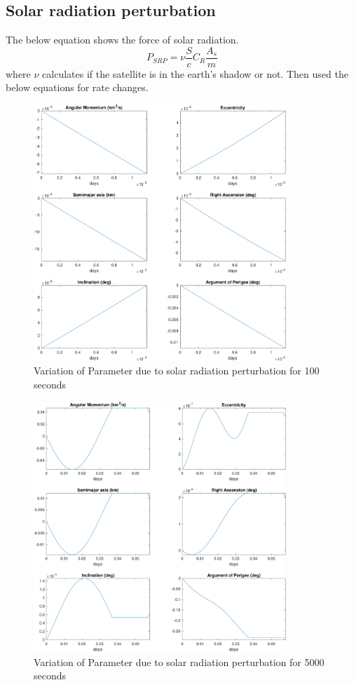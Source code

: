 \subsection{Solar radiation perturbation}
The below equation shows the force of solar radiation.
$$
P_{SRP} = \nu \dfrac{S}{c}C_R \dfrac{A_s}{m}
$$
where $\nu$ calculates if the satellite is in the earth's shadow or not.
Then used the below equations for rate changes.

\begin{figure}[H]
    \centering
    \includegraphics[width=0.85\textwidth]{../Figure/Q2/e_100}
    \caption{Variation of Parameter due to solar radiation perturbation for 100 seconds}
\end{figure}

\begin{figure}[H]
    \centering
    \includegraphics[width=0.85\textwidth]{../Figure/Q2/e_5000}
    \caption{Variation of Parameter due to solar radiation perturbation for 5000 seconds}
\end{figure}

